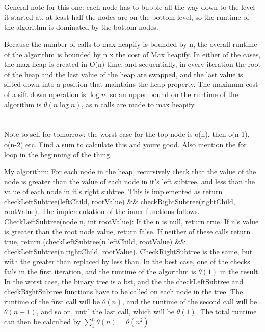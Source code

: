 \documentclass{article}
\begin{document}
\section{}

    General note for this one: each node has to bubble all the way down to the level
    it started at. at least half the nodes are on the bottom level, so the runtime
    of the algorithm is dominated by the bottom nodes.

    Because the number of calls to max heapify is bounded by n, the overall
    runtime of the algorithm is bounded by n x the cost of Max heapify. In
    either of the cases, the max heap is created in O(n) time, and
    sequentially, in every iteration the root of the heap and the last value of the heap are
    swapped, and the last value is sifted down into a position that maintains
    the heap property. The maximum cost of a sift down operation is $\log{n}$,
    so an upper bound on the runtime of the algorithm is $\theta(n\log{n})$,
    as n calls are made to max heapify.

\section{}

    Note to self for tomorrow: the worst case for the top node is o(n), then 
    o(n-1), o(n-2) etc. Find a sum to calculate this and youre good. Also mention 
    the for loop in the beginning of the thing. 

    My algorithm: For each node in the heap, recursively check that the value
    of the node is greater than the value of each node in it's left subtree,
    and less than the value of each node in it's right subtree. This is
    implemented as return checkLeftSubtree(leftChild, rootValue) \&\&
    checkRightSubtree(rightChild, rootValue). The implementation of the inner
    functions follows. CheckLeftSubtree(node n, int rootValue): If the n is
    null, return true. If n's value is greater than the root node value, return
    false. If neither of these calls return true, return
    (checkLeftSubtree(n.leftChild, rootValue) \&\& checkLeftSubtree(n.rightChild,
    rootValue). CheckRightSubtree is the same, but with the greater than replaced
    by less than. In the best case, one of the checks fails in the first iteration,
    and the runtime of the algorithm is $\theta(1)$ in the result. In the worst
    case, the binary tree is a bst, and the the checkLeftSubtree and checkRightSubtree 
    functions have to be called on each node in the tree. The runtime of the first call
    will be $\theta(n)$, and the runtime of the second call will be $\theta(n-1)$, and so
    on, until the last call, which will be $\theta(1)$. The total runtime can then be
    calculted by $\sum_1^n{ \theta(n) } = \theta(n^2)$.
\end{document}

